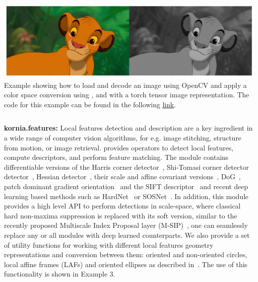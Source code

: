\vspace{.5cm}

\begin{tcolorbox}[every float=\centering, drop shadow, title=Example 2: Color Space Conversion]
    \label{fig:examples:color}
    \includegraphics[width=1.\linewidth]{main/chapter03/data/examples/color_simba.jpg}
    {Example showing how to load and decode an image using OpenCV and apply a color space conversion using \lib{}, and with a torch tensor image representation. The code for this example can be found in the following \underline{\color{blue}\href{https://colab.research.google.com/drive/1dgT9-QLZiTjxPK9Ej4YnyV953uTQKBCm}{link}}.}
    \inputminted[python3, baselinestretch=1., style=vs, fontfamily=courier, fontsize=\footnotesize, funcnamehighlighting=true]{python}{main/chapter03/data/examples/snipet_color.py}
\end{tcolorbox}

\newpage

\textbf{kornia.features:} Local features detection and description are a key ingredient in a wide range of computer vision algorithms, for e.g. image stitching, structure from motion, or image retrieval. \lib{} provides operators to detect local features, compute descriptors, and perform feature matching. The module contains differentiable versions of the Harris corner detector~\citep{Harris88}, Shi-Tomasi corner detector detector~\citep{Shi94goodfeatures}, Hessian detector~\citep{Hessian78},  their scale and affine covariant versions~\citep{Mikolajczyk2004}, DoG~\citep{Lowe2004}, patch dominant gradient orientation~\citep{Lowe2004} and the SIFT descriptor~\citep{Lowe2004} and recent deep learning based methods such as HardNet~\citep{mishchuk2017working} or SOSNet~\citep{tian2019sosnet}. In addition, this module provides a high level API to perform detections in scale-space, where classical hard non-maxima suppression is replaced with its soft version, similar to the recently proposed Multiscale Index Proposal layer (M-SIP)~\citep{KeyNet2019}, one can seamlessly replace any or all modules with deep learned counterparts. We also provide a set of utility functions for working with different local features geometry representations and conversion between them: oriented and non-oriented circles, local affine frames (LAFs) and oriented ellipses as described in~\citep{Mikolajczyk2004}. The use of this functionality is shown in Example 3.

